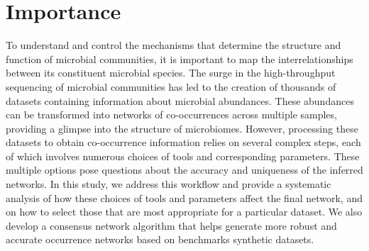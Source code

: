 \section*{Importance}
  To understand and control the mechanisms that determine the structure and function of microbial communities, it is important to map the interrelationships between its constituent microbial species.
  The surge in the high-throughput sequencing of microbial communities has led to the creation of thousands of datasets containing information about microbial abundances.
  These abundances can be transformed into networks of co-occurrences across multiple samples, providing a glimpse into the structure of microbiomes.
  However, processing these datasets to obtain co-occurrence information relies on several complex steps, each of which involves numerous choices of tools and corresponding parameters.
  These multiple options pose questions about the accuracy and uniqueness of the inferred networks.
  In this study, we address this workflow and provide a systematic analysis of how these choices of tools and parameters affect the final network, and on how to select those that are most appropriate for a particular dataset.
  We also develop a consensus network algorithm that helps generate more robust and accurate occurrence networks based on benchmarks synthetic datasets.
